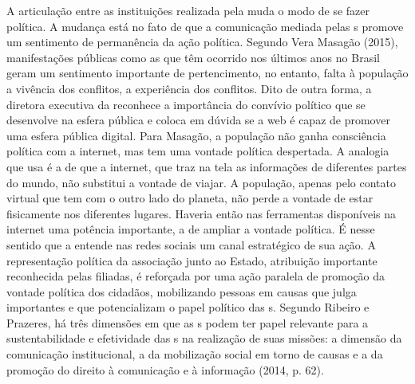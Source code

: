 A articulação entre as instituições realizada pela  muda o modo de
se fazer política. A mudança está no fato de que a comunicação mediada
pelas s promove um sentimento de permanência da ação política.
Segundo Vera Masagão (2015), manifestações públicas como as que têm
ocorrido nos últimos anos no Brasil geram um sentimento importante de
pertencimento, no entanto, falta à população a vivência dos conflitos, a
experiência dos conflitos. Dito de outra forma, a diretora executiva da
 reconhece a importância do convívio político que se desenvolve na
esfera pública e coloca em dúvida se a web é capaz de promover uma
esfera pública digital. Para Masagão, a população não ganha consciência
política com a internet, mas tem uma vontade política despertada. A
analogia que usa é a de que a internet, que traz na tela as informações
de diferentes partes do mundo, não substitui a vontade de viajar. A
população, apenas pelo contato virtual que tem com o outro lado do
planeta, não perde a vontade de estar fisicamente nos diferentes
lugares. Haveria então nas ferramentas disponíveis na internet uma
potência importante, a de ampliar a vontade política. É nesse sentido
que a  entende nas redes sociais um canal estratégico de sua ação.
A representação política da associação junto ao Estado, atribuição
importante reconhecida pelas filiadas, é reforçada por uma ação paralela
de promoção da vontade política dos cidadãos, mobilizando pessoas em
causas que julga importantes e que potencializam o papel político das
s. Segundo Ribeiro e Prazeres, há três dimensões em que as s podem
ter papel relevante para a sustentabilidade e efetividade das s na
realização de suas missões: a dimensão da comunicação institucional, a
da mobilização social em torno de causas e a da promoção do direito à
comunicação e à informação (2014, p. 62).

